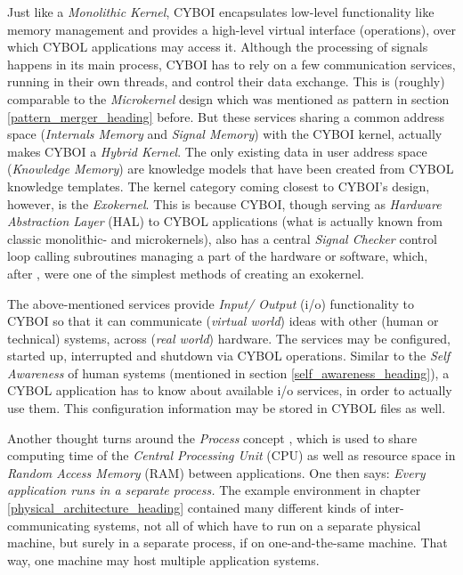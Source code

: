 Just like a \emph{Monolithic Kernel}, CYBOI encapsulates low-level functionality
like memory management and provides a high-level virtual interface (operations),
over which CYBOL applications may access it. Although the processing of signals
happens in its main process, CYBOI has to rely on a few communication services,
running in their own threads, and control their data exchange. This is (roughly)
comparable to the \emph{Microkernel} design which was mentioned as pattern in
section \ref{pattern_merger_heading} before. But these services sharing a common
address space (\emph{Internals Memory} and \emph{Signal Memory}) with the CYBOI
kernel, actually makes CYBOI a \emph{Hybrid Kernel}. The only existing data in
user address space (\emph{Knowledge Memory}) are knowledge models that have been
created from CYBOL knowledge templates. The kernel category coming closest to
CYBOI's design, however, is the \emph{Exokernel}. This is because CYBOI, though
serving as \emph{Hardware Abstraction Layer} (HAL) to CYBOL applications (what
is actually known from classic monolithic- and microkernels), also has a central
\emph{Signal Checker} control loop calling subroutines managing a part of the
hardware or software, which, after \cite{wikipedia}, were one of the simplest
methods of creating an exokernel.

The above-mentioned services provide \emph{Input/ Output} (i/o) functionality
to CYBOI so that it can communicate (\emph{virtual world}) ideas with other
(human or technical) systems, across (\emph{real world}) hardware. The services
may be configured, started up, interrupted and shutdown via CYBOL operations.
Similar to the \emph{Self Awareness} of human systems (mentioned in section
\ref{self_awareness_heading}), a CYBOL application has to know about available
i/o services, in order to actually use them. This configuration information may
be stored in CYBOL files as well.

Another thought turns around the \emph{Process} concept \cite{tanenbaum2001},
which is used to share computing time of the \emph{Central Processing Unit}
(CPU) as well as resource space in \emph{Random Access Memory} (RAM) between
applications. One then says: \textit{Every application runs in a separate
process.} The example environment in chapter \ref{physical_architecture_heading}
contained many different kinds of inter-communicating systems, not all of which
have to run on a separate physical machine, but surely in a separate process,
if on one-and-the-same machine. That way, one machine may host multiple
application systems.

